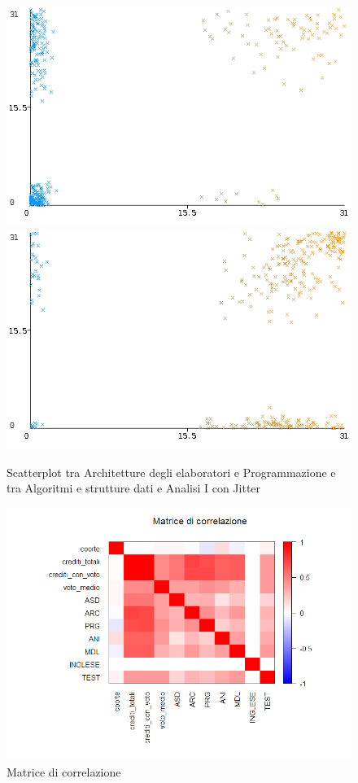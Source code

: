 \documentclass[12pt]{article}
\begin{document}
\begin{figure}[H]
	\centering
	\includegraphics[width=\textwidth]{img/arcPrgWeka.png}
	\includegraphics[width=\textwidth]{img/asdAniWeka.png}
	\caption{Scatterplot tra Architetture degli elaboratori e Programmazione e tra Algoritmi e strutture dati e Analisi I con Jitter}
\end{figure}

\begin{figure}[H]
	\includegraphics[width=\textwidth]{img/corMatrix.png}
	\caption{Matrice di correlazione}
	\label{fig:cMatrix}
\end{figure}
\end{document}
